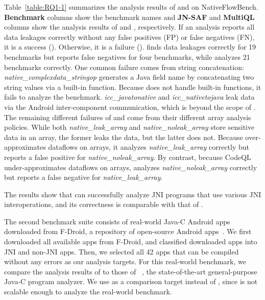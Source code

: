 Table~\ref{table:RQ1-1} summarizes the analysis results of \jnsaf and \ours on
NativeFlowBench.  {\bf Benchmark} columns show the benchmark names and {\bf
JN-SAF} and {\bf MultiQL} columns show the analysis results of \jnsaf and
\ours, respectively.  If an analysis reports all data leakages correctly
without any false positives (FP) or false negatives (FN), it is a success
(\cmark).  Otherwise, it is a failure (\xmark).  \ours finds data leakages
correctly for 19 benchmarks but reports false negatives for four benchmarks,
while \jnsaf analyzes 21 benchmarks correctly.  One common failure comes from
string concatenation: {\it native\_complexdata\_stringop} generates a Java
field name by concatenating two string values via a built-in function.  Because
\ours does not handle built-in functions, it fails to analyze the benchmark.
{\it icc\_javatonative} and {\it icc\_nativetojava} leak data via the Android
inter-component communication, which is beyond the scope of \ours.  The
remaining different failures of \ours and \jnsaf come from their different
array analysis policies.  While both {\it native\_leak\_array} and {\it
native\_noleak\_array} store sensitive data in an array, the former leaks the
data, but the latter does not.  Because \jnsaf over-approximates dataflows on
arrays, it analyzes {\it native\_leak\_array} correctly but reports a false
positive for {\it native\_noleak\_array}.  By contrast, because CodeQL
under-approximates dataflows on arrays, \ours analyzes {\it
native\_noleak\_array} correctly but reports a false negative for {\it
native\_leak\_array}.

The results show that \ours can successfully analyze JNI programs that use
various JNI interoperations, and its correctness is comparable with that of
\jnsaf.

The second benchmark suite consists of real-world Java-C Android apps
downloaded from F-Droid, a repository of open-source Android
apps~\cite{fdroid}.  We first downloaded all available apps from F-Droid, and
classified downloaded apps into JNI and non-JNI apps.  Then, we selected all 42
apps that can be compiled without any errors as our analysis targets.  For this
real-world benchmark, we compare the analysis results of \ours to those of
\lees~\cite{LeeASE20}, the state-of-the-art general-purpose Java-C program
analyzer.  We use \lees as a comparison target instead of \jnsaf, since \jnsaf
is not scalable enough to analyze the real-world benchmark.



